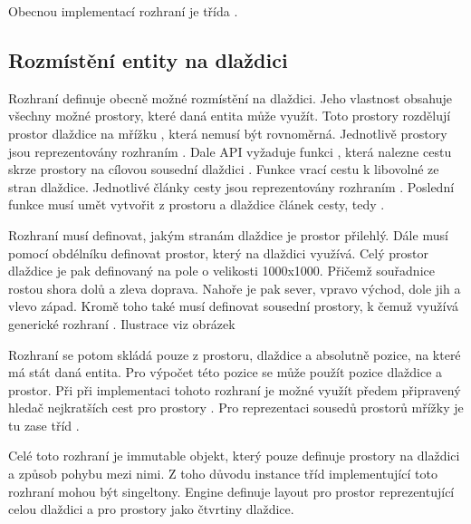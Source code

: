 Obecnou implementací rozhraní je třída . 

\subsection{Rozmístění entity na dlaždici}\label{layout-manager-section}

Rozhraní  definuje obecně možné rozmístění na dlaždici. Jeho vlastnost  obsahuje všechny možné prostory, které daná entita může využít.
Toto prostory rozdělují prostor dlaždice na mřížku , která nemusí být rovnoměrná.
Jednotlivě prostory jsou reprezentovány rozhraním . Dale API vyžaduje funkci , která nalezne cestu skrze prostory
na cílovou sousední dlaždici . Funkce  vrací cestu k libovolné ze stran dlaždice. Jednotlivé články cesty jsou 
reprezentovány rozhraním . Poslední funkce musí umět vytvořit z prostoru a dlaždice článek cesty,
tedy .  


Rozhraní  musí definovat, jakým stranám dlaždice je prostor přilehlý. Dále musí pomocí obdélníku definovat prostor, který na dlaždici využívá.
Celý prostor dlaždice je pak definovaný na pole o velikosti 1000x1000. Přičemž souřadnice rostou
shora dolů a zleva doprava. Nahoře je pak sever, vpravo východ, dole jih a vlevo západ. Kromě toho také musí definovat sousední
prostory, k čemuž využívá generické rozhraní . Ilustrace viz obrázek 



Rozhraní  se potom skládá pouze z prostoru, dlaždice a absolutně pozice, na které má stát daná entita.
Pro výpočet této pozice se může použít pozice dlaždice a prostor. Při při implementaci tohoto rozhraní je možné využít 
předem připravený hledač nejkratších cest pro prostory . Pro reprezentaci sousedů prostorů mřížky je tu 
zase tříd .

Celé toto rozhraní je immutable objekt, který pouze definuje prostory na dlaždici a způsob pohybu mezi nimi. Z toho důvodu
instance tříd implementující toto rozhraní mohou být singeltony. Engine definuje layout pro prostor reprezentující celou dlaždici
a pro prostory jako čtvrtiny dlaždice.

